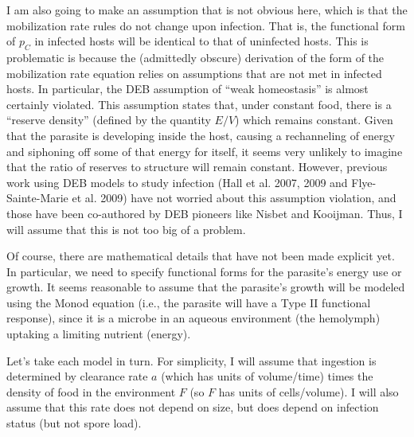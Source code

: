 \documentclass[11pt,reqno,final,pdftex]{amsart}\usepackage[]{graphicx}\usepackage[]{color}
\theoremstyle{plain}
\numberwithin{equation}{part}
\begin{document}
I am also going to make an assumption that is not obvious here, which is that the mobilization rate rules do not change upon infection.
That is, the functional form of $p_C$ in infected hosts will be identical to that of uninfected hosts.
This is problematic is because the (admittedly obscure) derivation of the form of the mobilization rate equation relies on assumptions that are not met in infected hosts.
In particular, the DEB assumption of ``weak homeostasis'' is almost certainly violated.
This assumption states that, under constant food, there is a ``reserve density'' (defined by the quantity $E/V$) which remains constant.
Given that the parasite is developing inside the host, causing a rechanneling of energy and siphoning off some of that energy for itself, it seems very unlikely to imagine that the ratio of reserves to structure will remain constant.
However, previous work using DEB models to study infection (Hall et al. 2007, 2009 and Flye-Sainte-Marie et al. 2009) have not worried about this assumption violation, and those have been co-authored by DEB pioneers like Nisbet and Kooijman.
Thus, I will assume that this is not too big of a problem.

Of course, there are mathematical details that have not been made explicit yet.
In particular, we need to specify functional forms for the parasite's energy use or growth.
It seems reasonable to assume that the parasite's growth will be modeled using the Monod equation (i.e., the parasite will have a Type II functional response), since it is a microbe in an aqueous environment (the hemolymph) uptaking a limiting nutrient (energy).

Let's take each model in turn.
For simplicity, I will assume that ingestion is determined by clearance rate $a$ (which has units of volume/time) times the density of food in the environment $F$ (so $F$ has units of cells/volume).
I will also assume that this rate does not depend on size, but does depend on infection status (but not spore load).
\end{document}
